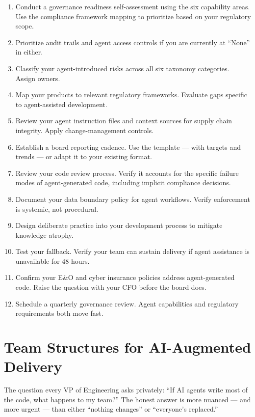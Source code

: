 \documentclass[
  a4paper,
  DIV=11,
  numbers=noendperiod]{scrreprt}
\providecommand{\tightlist}{%
  \setlength{\itemsep}{0pt}\setlength{\parskip}{0pt}}
\begin{document}
\begin{enumerate}
\def\labelenumi{\arabic{enumi}.}
\tightlist
\item
  Conduct a governance readiness self-assessment using the six
  capability areas. Use the compliance framework mapping to prioritize
  based on your regulatory scope.
\item
  Prioritize audit trails and agent access controls if you are currently
  at ``None'' in either.
\item
  Classify your agent-introduced risks across all six taxonomy
  categories. Assign owners.
\item
  Map your products to relevant regulatory frameworks. Evaluate gaps
  specific to agent-assisted development.
\item
  Review your agent instruction files and context sources for supply
  chain integrity. Apply change-management controls.
\item
  Establish a board reporting cadence. Use the template --- with targets
  and trends --- or adapt it to your existing format.
\item
  Review your code review process. Verify it accounts for the specific
  failure modes of agent-generated code, including implicit compliance
  decisions.
\item
  Document your data boundary policy for agent workflows. Verify
  enforcement is systemic, not procedural.
\item
  Design deliberate practice into your development process to mitigate
  knowledge atrophy.
\item
  Test your fallback. Verify your team can sustain delivery if agent
  assistance is unavailable for 48 hours.
\item
  Confirm your E\&O and cyber insurance policies address agent-generated
  code. Raise the question with your CFO before the board does.
\item
  Schedule a quarterly governance review. Agent capabilities and
  regulatory requirements both move fast.
\end{enumerate}

\chapter{Team Structures for AI-Augmented
Delivery}\label{team-structures-for-ai-augmented-delivery}

The question every VP of Engineering asks privately: ``If AI agents
write most of the code, what happens to my team?'' The honest answer is
more nuanced --- and more urgent --- than either ``nothing changes'' or
``everyone's replaced.''
\end{document}
